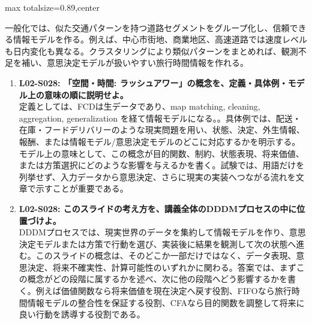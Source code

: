 \begin{minipage}[t]{0.58\textwidth}
\begin{adjustbox}{max totalsize={\textwidth}{0.89\textheight},center}
\begin{minipage}{\textwidth}
一般化では、似た交通パターンを持つ道路セグメントをグループ化し、信頼できる情報モデルを作る。例えば、中心市街地、商業地区、高速道路では速度レベルも日内変化も異なる。クラスタリングにより類似パターンをまとめれば、観測不足を補い、意思決定モデルが扱いやすい旅行時間情報を作れる。\par{}\begin{enumerate}\item \textbf{L02-S028: 「空間・時間: ラッシュアワー」の概念を、定義・具体例・モデル上の意味の順に説明せよ。}\\定義としては、FCDは生データであり、map matching, cleaning, aggregation, generalization を経て情報モデルになる。。具体例では、配送・在庫・フードデリバリーのような現実問題を用い、状態、決定、外生情報、報酬、または情報モデル/意思決定モデルのどこに対応するかを明示する。モデル上の意味として、この概念が目的関数、制約、状態表現、将来価値、または方策選択にどのような影響を与えるかを書く。試験では、用語だけを列挙せず、入力データから意思決定、さらに現実の実装へつながる流れを文章で示すことが重要である。\item \textbf{L02-S028: このスライドの考え方を、講義全体のDDDMプロセスの中に位置づけよ。}\\DDDMプロセスでは、現実世界のデータを集約して情報モデルを作り、意思決定モデルまたは方策で行動を選び、実装後に結果を観測して次の状態へ進む。このスライドの概念は、そのどこか一部だけではなく、データ表現、意思決定、将来不確実性、計算可能性のいずれかに関わる。答案では、まずこの概念がどの段階に属するかを述べ、次に他の段階へどう影響するかを書く。例えば価値関数なら将来価値を現在決定へ戻す役割、FIFOなら旅行時間情報モデルの整合性を保証する役割、CFAなら目的関数を調整して将来に良い行動を誘導する役割である。\end{enumerate}
\end{minipage}
\end{adjustbox}
\end{minipage}


